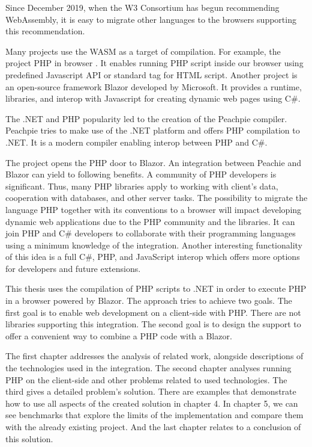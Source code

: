 Since December 2019, when the W3 Consortium has begun recommending WebAssembly, it is easy to migrate other languages to the browsers supporting this recommendation.
\par
Many projects use the WASM as a target of compilation.
For example, the project PHP in browser .
It enables running PHP script inside our browser using predefined Javascript API or standard tag for HTML script.
Another project is an open-source framework Blazor  developed by Microsoft.
It provides a runtime, libraries, and interop with Javascript for creating dynamic web pages using C\#.
\par
{}
The .NET and PHP popularity led to the creation of the Peachpie compiler.
Peachpie  tries to make use of the .NET platform and offers PHP compilation to .NET.
It is a modern compiler enabling interop between PHP and C\#.
\par
The project opens the PHP door to Blazor.
An integration between Peachie and Blazor can yield to following benefits.
A community of PHP developers is significant.
Thus, many PHP libraries apply to working with client's data, cooperation with databases, and other server tasks.
The possibility to migrate the language PHP together with its conventions to a browser will impact developing dynamic web applications due to the PHP community and the libraries.
It can join PHP and C\# developers to collaborate with their programming languages using a minimum knowledge of the integration.
Another interesting functionality of this idea is a full C\#, PHP, and JavaScript interop which offers more options for developers and future extensions.
\par
This thesis uses the compilation of PHP scripts to .NET in order to execute PHP in a browser powered by Blazor.
The approach tries to achieve two goals.
The first goal is to enable web development on a client-side with PHP.
There are not libraries supporting this integration.
The second goal is to design the support to offer a convenient way to combine a PHP code with a Blazor.   
\par
The first chapter addresses the analysis of related work, alongside descriptions of the technologies used in the integration.
The second chapter analyses running PHP on the client-side and other problems related to used technologies.
The third gives a detailed problem's solution.
There are examples that demonstrate how to use all aspects of the created solution in chapter 4.
In chapter 5, we can see benchmarks that explore the limits of the implementation and compare them with the already existing project.
And the last chapter relates to a conclusion of this solution.
